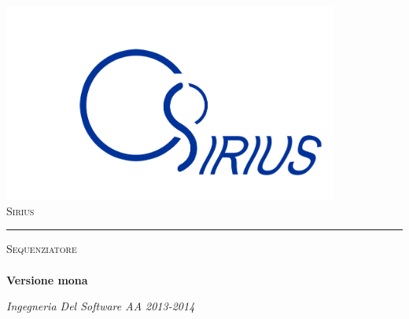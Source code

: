 \begin{titlepage}
 \begin{center}
     \includegraphics[width=11cm]{../modello/img/sirius11.png}\\
     \vspace{1em}
     {\LARGE \textsc{Sirius}}\\
     \vspace{2em} \hrule \vspace{2em}
     {\Large \textsc{Sequenziatore}}\\
     \vspace{8em}
     {\LARGE \LARGE \LARGE \textbf{\doctitle}}\\
     \vspace{2em}
     {\LARGE \LARGE \LARGE \textbf{Versione mona }}\\
     \vspace{4em}
 \end{center}


\vskip 1.8cm
\begin{center}
\textit{Ingegneria Del Software AA 2013-2014}
\end{center}

\end{titlepage}

